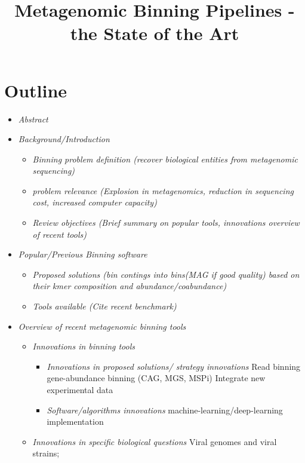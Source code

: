\documentclass{article}
\title{Metagenomic Binning Pipelines - the State of the Art}
\date{}
\begin{document}
\maketitle

\section*{Outline}
\begin{itemize}
\item\emph{Abstract} 
\item\emph{Background/Introduction} 
          \begin{itemize}
	  	\item\emph{Binning problem definition (recover biological entities from metagenomic sequencing)} 
          	\item\emph{problem relevance (Explosion in metagenomics, reduction in sequencing cost, increased computer capacity)} 
          	\item\emph{Review objectives (Brief summary on popular tools, innovations overview of recent tools)} 
	  \end{itemize}
 \item\emph{Popular/Previous Binning software} 
 	\begin{itemize}
         	\item\emph{Proposed solutions (bin contings into bins(MAG if good quality) based on their kmer composition and abundance/coabundance)} 
         	\item\emph{Tools available (Cite recent benchmark)} 
	\end{itemize}   
\item\emph{Overview of recent metagenomic binning tools} 
          \begin{itemize}
	  	\item\emph{Innovations in binning tools}
	  	\begin{itemize}
                	 \item\emph{Innovations in proposed solutions/ strategy innovations} 
                         Read binning 
 		   	 gene-abundance binning (CAG, MGS, MSPi)
                         Integrate new experimental data 
                 	\item\emph{Software/algorithms innovations} 
                         machine-learning/deep-learning implementation
		\end{itemize}
           \item\emph{Innovations in specific biological questions} 
                 Viral genomes and viral strains; 

\end{itemize}
\end{itemize}
\end{document}
